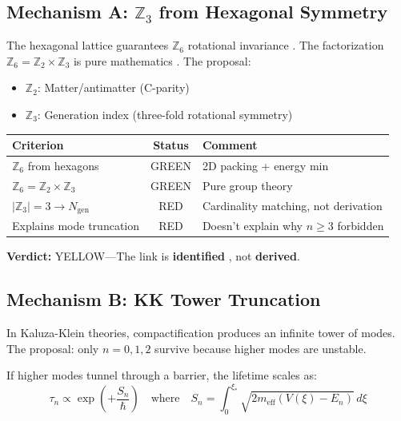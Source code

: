 \subsection{Mechanism A: $\mathbb{Z}_3$ from Hexagonal Symmetry}

The hexagonal lattice guarantees $\mathbb{Z}_6$ rotational invariance \tagDc{}.
The factorization $\mathbb{Z}_6 = \mathbb{Z}_2 \times \mathbb{Z}_3$ is pure
mathematics \tagM{}. The proposal:
\begin{itemize}[nosep]
    \item $\mathbb{Z}_2$: Matter/antimatter (C-parity) \tagP{}
    \item $\mathbb{Z}_3$: Generation index (three-fold rotational symmetry) \tagP{}
\end{itemize}

\begin{center}
\begin{tabular}{lcl}
\toprule
\textbf{Criterion} & \textbf{Status} & \textbf{Comment} \\
\midrule
$\mathbb{Z}_6$ from hexagons & GREEN & 2D packing + energy min \tagDc{} \\
$\mathbb{Z}_6 = \mathbb{Z}_2 \times \mathbb{Z}_3$ & GREEN & Pure group theory \tagM{} \\
$|\mathbb{Z}_3| = 3 \to N_{\text{gen}}$ & RED & Cardinality matching, not derivation \\
Explains mode truncation & RED & Doesn't explain why $n \geq 3$ forbidden \\
\bottomrule
\end{tabular}
\end{center}

\textbf{Verdict:} YELLOW---The link is \textbf{identified} \tagI{}, not \textbf{derived}.

\subsection{Mechanism B: KK Tower Truncation}

In Kaluza-Klein theories, compactification produces an infinite tower of modes.
The proposal: only $n = 0, 1, 2$ survive because higher modes are unstable.

If higher modes tunnel through a barrier, the lifetime scales as:
\begin{equation}
    \tau_n \propto \exp\left(+\frac{S_n}{\hbar}\right)
    \quad\text{where}\quad
    S_n = \int_0^{\xi_*} \sqrt{2m_{\text{eff}}(V(\xi) - E_n)} \, d\xi
    \label{eq:lifetime}
\end{equation}


